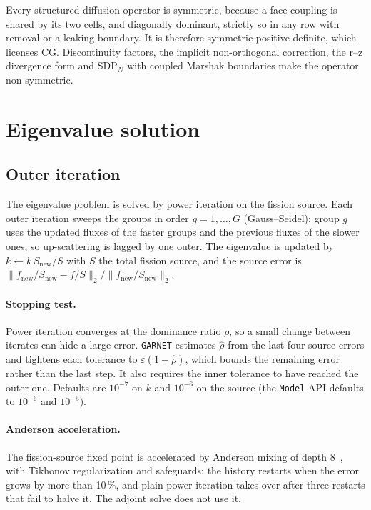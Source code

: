 \documentclass[a4paper,10pt]{article}
\newcommand{\garnet}{\texttt{GARNET}}
\newcommand{\code}[1]{\texttt{#1}}
\begin{document}
Every structured diffusion operator is symmetric, because a face coupling is
shared by its two cells, and diagonally dominant, strictly so in any row with
removal or a leaking boundary. It is therefore symmetric positive definite, which
licenses CG. Discontinuity factors, the implicit non-orthogonal correction, the
r--z divergence form and SDP$_N$ with coupled Marshak boundaries make the
operator non-symmetric.

\section{Eigenvalue solution}
\label{sec:eigen}

\subsection{Outer iteration}

The eigenvalue problem is solved by power iteration on the fission source. Each
outer iteration sweeps the groups in order $g = 1,\dots,G$ (Gauss--Seidel): group
$g$ uses the updated fluxes of the faster groups and the previous fluxes of the
slower ones, so up-scattering is lagged by one outer. The eigenvalue is updated by
$k \leftarrow k\,S_\mathrm{new}/S$ with $S$ the total fission source, and the
source error is $\|f_\mathrm{new}/S_\mathrm{new} - f/S\|_2/\|f_\mathrm{new}/S_\mathrm{new}\|_2$.

\paragraph{Stopping test.} Power iteration converges at the dominance ratio
$\rho$, so a small change between iterates can hide a large error. \garnet{}
estimates $\hat\rho$ from the last four source errors and tightens each
tolerance to $\varepsilon(1-\hat\rho)$, which bounds the remaining error rather
than the last step. It also requires the inner tolerance to have reached the
outer one. Defaults are $10^{-7}$ on $k$ and $10^{-6}$ on the source
(the \code{Model} API defaults to $10^{-6}$ and $10^{-5}$).

\paragraph{Anderson acceleration.} The fission-source fixed point is accelerated
by Anderson mixing of depth 8~\cite{walker2011}, with Tikhonov regularization and
safeguards: the history restarts when the error grows by more than 10\,\%, and
plain power iteration takes over after three restarts that fail to halve it.
The adjoint solve does not use it.
\end{document}
